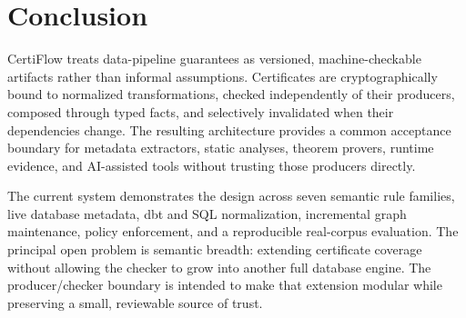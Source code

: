 \section{Conclusion}

CertiFlow treats data-pipeline guarantees as versioned, machine-checkable artifacts rather than informal assumptions. Certificates are cryptographically bound to normalized transformations, checked independently of their producers, composed through typed facts, and selectively invalidated when their dependencies change. The resulting architecture provides a common acceptance boundary for metadata extractors, static analyses, theorem provers, runtime evidence, and AI-assisted tools without trusting those producers directly.

The current system demonstrates the design across seven semantic rule families, live database metadata, dbt and SQL normalization, incremental graph maintenance, policy enforcement, and a reproducible real-corpus evaluation. The principal open problem is semantic breadth: extending certificate coverage without allowing the checker to grow into another full database engine. The producer/checker boundary is intended to make that extension modular while preserving a small, reviewable source of trust.
